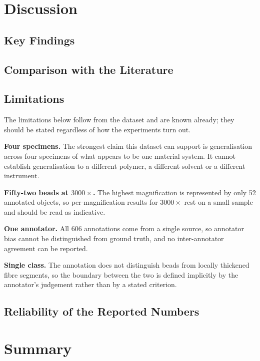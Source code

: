 \section{Discussion}

\subsection{Key Findings}

\subsection{Comparison with the Literature}

\subsection{Limitations}

The limitations below follow from the dataset and are known already; they should be
stated regardless of how the experiments turn out.

\textbf{Four specimens.} The strongest claim this dataset can support is
generalisation across four specimens of what appears to be one material system. It
cannot establish generalisation to a different polymer, a different solvent or a
different instrument.

\textbf{Fifty-two beads at $3000\times$.} The highest magnification is represented by
only 52 annotated objects, so per-magnification results for $3000\times$ rest on a
small sample and should be read as indicative.

\textbf{One annotator.} All 606 annotations come from a single source, so
annotator bias cannot be distinguished from ground truth, and no inter-annotator
agreement can be reported.

\textbf{Single class.} The annotation does not distinguish beads from locally
thickened fibre segments, so the boundary between the two is defined implicitly by
the annotator's judgement rather than by a stated criterion.

\subsection{Reliability of the Reported Numbers}


\section{Summary}

